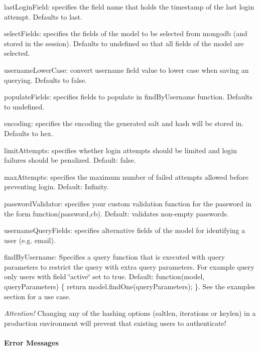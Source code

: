 \begin{DoxyItemize}
\item last\+Login\+Field\+: specifies the field name that holds the timestamp of the last login attempt. Defaults to \textquotesingle{}last\textquotesingle{}.
\item select\+Fields\+: specifies the fields of the model to be selected from mongodb (and stored in the session). Defaults to \textquotesingle{}undefined\textquotesingle{} so that all fields of the model are selected.
\item username\+Lower\+Case\+: convert username field value to lower case when saving an querying. Defaults to \textquotesingle{}false\textquotesingle{}.
\item populate\+Fields\+: specifies fields to populate in find\+By\+Username function. Defaults to \textquotesingle{}undefined\textquotesingle{}.
\item encoding\+: specifies the encoding the generated salt and hash will be stored in. Defaults to \textquotesingle{}hex\textquotesingle{}.
\item limit\+Attempts\+: specifies whether login attempts should be limited and login failures should be penalized. Default\+: false.
\item max\+Attempts\+: specifies the maximum number of failed attempts allowed before preventing login. Default\+: Infinity.
\item password\+Validator\+: specifies your custom validation function for the password in the form \textquotesingle{}function(password,cb)\textquotesingle{}. Default\+: validates non-\/empty passwords.
\item username\+Query\+Fields\+: specifies alternative fields of the model for identifying a user (e.\+g. email).
\item find\+By\+Username\+: Specifies a query function that is executed with query parameters to restrict the query with extra query parameters. For example query only users with field \char`\"{}active\char`\"{} set to {\ttfamily true}. Default\+: {\ttfamily function(model, query\+Parameters) \{ return model.\+find\+One(query\+Parameters); \}}. See the examples section for a use case.
\end{DoxyItemize}

{\itshape Attention!} Changing any of the hashing options (saltlen, iterations or keylen) in a production environment will prevent that existing users to authenticate!

\paragraph*{Error Messages}

